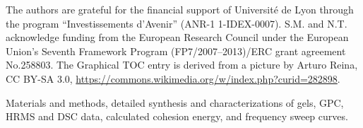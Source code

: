 \documentclass[journal=jacsat,manuscript=article]{achemso}
\begin{document}
\begin{acknowledgement}
The authors are grateful for the financial support of Université de Lyon through the program ``Investissements d'Avenir'' (ANR-1 1-IDEX-0007). S.M. and N.T. acknowledge funding from the European Research Council under the European Union's Seventh Framework Program (FP7/2007–2013)/ERC grant agreement No.258803. The Graphical TOC entry is derived from a picture by Arturo Reina, CC BY-SA 3.0, \url{https://commons.wikimedia.org/w/index.php?curid=282898}.
\end{acknowledgement}

\begin{suppinfo}

Materials and methods, detailed synthesis and characterizations of gels, GPC, HRMS and DSC data, calculated cohesion energy, and frequency sweep curves.

\end{suppinfo}


\end{document}
